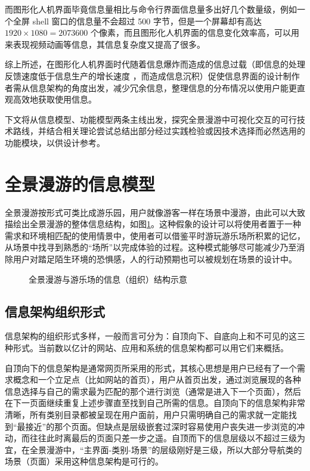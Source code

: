 而图形化人机界面毕竟信息量相比与命令行界面信息量多出好几个数量级，例如一个全屏 shell 窗口的信息量不会超过 500 字节，但是一个屏幕却有高达 $1920\times1080=2073600$ 个像素，而且图形化人机界面的信息变化效率高，可以用来表现视频动画等信息，其信息复杂度又提高了很多。

综上所述，在图形化人机界面时代随着信息爆炸而造成的信息过载（即信息的处理反馈速度低于信息生产的增长速度
，而造成信息沉积）促使信息界面的设计制作者需从信息架构的角度出发，减少冗余信息，整理信息的分布情况以使用户能更直观高效地获取使用信息。

下文将从信息模型、功能模型两条主线出发，探究全景漫游中可视化交互的可行技术路线，并结合相关理论尝试总结出部分经过实践检验或因技术选择而必然选用的功能模块，以供设计参考。


\section{全景漫游的信息模型}

全景漫游按形式可类比成游乐园，用户就像游客一样在场景中漫游，由此可以大致描绘出全景漫游的整体信息结构，如图\ref{fig:park}。这种假象的设计可以将使用者置于一种需求和环境相匹配的使用情景中，使用者可以借鉴平时游玩游乐场所积累的记忆，从场景中找寻到熟悉的“场所”以完成体验的过程。这种模式能够尽可能减少乃至消除用户对踏足陌生环境的恐惧感，人的行动预期也可以被规划在场景的设计中。

\begin{figure}[htp]
\centering
{}
\caption{全景漫游与游乐场的信息（组织）结构示意}
\label{fig:park}
\end{figure}

\subsection{信息架构组织形式}
信息架构的组织形式多样，一般而言可分为：自顶向下、自底向上和不可见的这三种形式。当前数以亿计的网站、应用和系统的信息架构都可以用它们来概括。

自顶向下的信息架构是通常网页所采用的形式，其核心思想是用户已经有了一个需求概念和一个立足点（比如网站的首页），用户从首页出发，通过浏览展现的各种信息选择与自己的需求最为匹配的那个进行浏览（通常是进入下一个页面），然后在下一页面继续重复上述步骤直至找到自己所需的信息。自顶向下的信息架构非常清晰，所有类别目录都被呈现在用户面前，用户只需明确自己的需求就一定能找到“最接近”的那个页面。但缺点是层级嵌套过深时容易使用户丧失进一步浏览的冲动，而往往此时离最后的页面只差一步之遥。自顶而下的信息层级以不超过三级为宜，在全景漫游中，“主界面-类别-场景”的层级刚好是三级，所以大部分导航类的场景（页面）采用这种信息架构是可行的。

